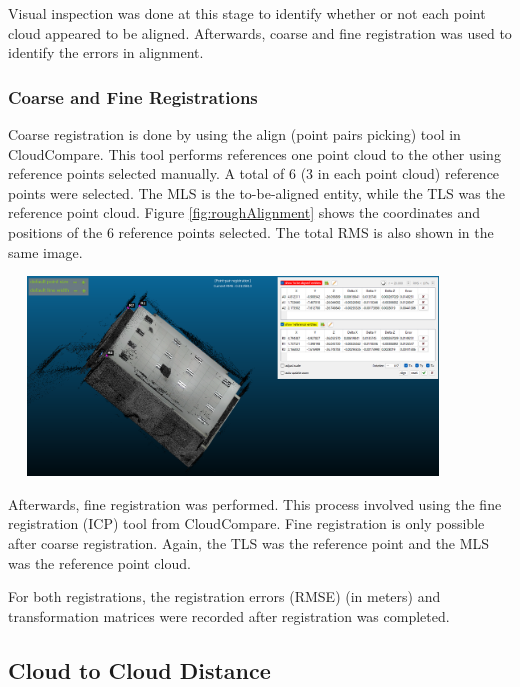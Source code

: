\documentclass[man]{apa7}
\begin{document}
\begin{minipage}{\linewidth}
  \label{fig:manualAlignment}
\end{minipage}

Visual inspection was done at this stage to identify whether or not each point cloud appeared to be aligned. Afterwards, coarse and fine registration was used to identify the errors in alignment.

\subsubsection{Coarse and Fine Registrations}
Coarse registration is done by using the align (point pairs picking) tool in CloudCompare. This tool performs references one point cloud to the other using reference points selected manually. A total of 6 (3 in each point cloud) reference points were selected. The MLS is the to-be-aligned entity, while the TLS was the reference point cloud. Figure \ref{fig:roughAlignment} shows the coordinates and positions of the 6 reference points selected. The total RMS is also shown in the same image.

\begin{minipage}{\linewidth}
  \includegraphics[height=200px,width=450px]{figures/RoughAlignment1.png}
  \label{fig:roughAlignment}
\end{minipage}

Afterwards, fine registration was performed. This process involved using the fine registration (ICP) tool from CloudCompare. Fine registration is only possible after coarse registration. Again, the TLS was the reference point and the MLS was the reference point cloud. 

For both registrations, the registration errors (RMSE) (in meters) and transformation matrices were recorded after registration was completed.

\subsection{Cloud to Cloud Distance}
\end{document}
